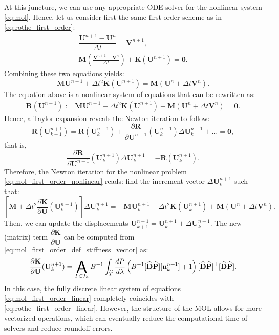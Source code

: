 \documentclass{sfuthesis}
\numberwithin{equation}{section}
\numberwithin{figure}{chapter}
\numberwithin{table}{chapter}
\theoremstyle{definition}
\def\*#1{{\mathbf{#1}}} %
\newcommand{\pder}[2]{\dfrac{\partial #1}{\partial #2}}
\newcommand{\der}[2]{\dfrac{d #1}{d #2}}
\DeclareMathOperator*{\assembly}{\scalerel*{\mathsf{A}}{\sum}}
\begin{document}
At this juncture, we can use any appropriate ODE solver for the nonlinear system \eqref{eq:mol}. Hence, let us consider first the same first order scheme as in \eqref{eq:rothe_first_order}:
\begin{subequations} \label{eq:mol_first_order}
    \begin{gather}
        \dfrac{\*U^{n+1} - \*U^{n}}{\Delta t} = \*V^{n+1}, \\
	    \*M \left( \frac{\*V^{n+1} - \*V^n}{\Delta t} \right) + \*K(\*U^{n+1}) = \*0.
    \end{gather}
\end{subequations}
Combining these two equations yields:
 \begin{equation} \label{eq:mol_first_order_nonlinear}
	\*M \*U^{n+1} + \Delta t^2 \*K(\*U^{n+1}) = \*M(\*U^n + \Delta t \*V^n).	
 \end{equation}
The equation above is a nonlinear system of equations that can be rewritten as:
 \begin{eqnarray}
     \*R(\*U^{n+1}) := \*M \*U^{n+1} + \Delta t^2 \*K(\*U^{n+1}) - \*M(\*U^n + \Delta t \*V^n) = \*0.
 \end{eqnarray}
 Hence, a Taylor expansion reveals the Newton iteration to follow:
 \begin{equation}
     \*R(\*U^{n+1}_{k+1}) = \*R(\*U^{n+1}_k) + \pder{\*R}{\*U^{n+1}}(\*U_k^{n+1}) \Delta \*U_{k}^{n+1} + \dots = \*0,
 \end{equation}
 that is,
 \begin{equation}
     \pder{\*R}{\*U^{n+1}}(\*U_k^{n+1}) \Delta \*U_{k}^{n+1} = -\*R(\*U_k^{n+1}).
 \end{equation}
 Therefore, the Newton iteration for the nonlinear problem \eqref{eq:mol_first_order_nonlinear} reads: find the increment vector $\Delta \*U_{k}^{n+1}$ such that:
 \begin{equation} \label{eq:mol_first_order_linear}
     \left[ \*M + \Delta t^2 \pder{\*K}{\*U}(\*U_k^{n+1}) \right] \Delta \*U_{k}^{n+1} = - \*M \*U_k^{n+1} - \Delta t^2 \*K(\*U_k^{n+1}) + \*M(\*U^n + \Delta t \*V^n).
 \end{equation}
Then, we can update the displacements $\*U_{k+1}^{n+1} = \*U_k^{n+1} + \Delta \*U_{k}^{n+1}$. The new (matrix) term $\pder{\*K}{\*U}$ can be computed from \eqref{eq:mol_first_order_def_stiffness_vector} as:
\begin{equation} \label{eq:jacobian_dK_dU}
    \pder{\*K}{\*U}(\*U_k^{n+1})  = \assembly_{T \in \mathcal{T}_h} B^{-1} \int_{\widehat{T}} \der{P}{\lambda} \left(B^{-1} [\widehat{\*D}\widehat{\*P}][\*u_k^{n+1}] + 1 \right) [\widehat{\*D}\widehat{\*P}]^\top[\widehat{\*D}\widehat{\*P}].
\end{equation}
In this case, the fully discrete linear system of equations \eqref{eq:mol_first_order_linear} completely coincides with \eqref{eq:rothe_first_order_linear}. However, the structure of the MOL allows for more vectorized operations, which can eventually reduce the computational time of solvers and reduce roundoff errors.
\end{document}
